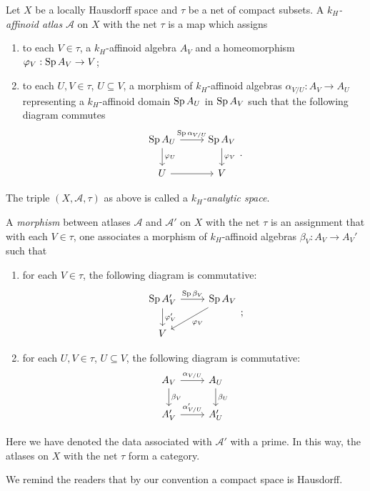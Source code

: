 \begin{definition}
    Let $X$ be a locally Hausdorff space and $\tau$ be a net of compact subsets. A \emph{$k_H$-affinoid atlas} $\mathcal{A}$ on $X$ with the net $\tau$ is a map which assigns 
    \begin{enumerate}
        \item to each $V\in \tau$, a $k_H$-affinoid algebra $A_V$ and a homeomorphism $\varphi_V:\operatorname{Sp} A_V\rightarrow V$;
        \item to each $U,V\in \tau$, $U\subseteq V$, a morphism of $k_H$-affinoid algebras $\alpha_{V/U}:A_V\rightarrow A_U$ representing a $k_H$-affinoid domain $\operatorname{Sp} A_U$ in $\operatorname{Sp} A_V$ such that the following diagram commutes
        \[
            \begin{tikzcd}
                \Sp A_U \arrow[d, "\varphi_U"] \arrow[r, "\Sp \alpha_{V/U}"] & \Sp A_V \arrow[d, "\varphi_V"] \\
                U \arrow[r]                                                  & V                             
            \end{tikzcd}.  
        \]
    \end{enumerate}
    The triple $(X,\mathcal{A},\tau)$ as above is called a \emph{$k_H$-analytic space}.

    A \emph{morphism} between atlases $\mathcal{A}$ and $\mathcal{A}'$ on $X$ with the net $\tau$ is an assignment that with each $V\in \tau$, one associates a morphism of $k_H$-affinoid algebras $\beta_V:A_V\rightarrow A_V'$ such that
    \begin{enumerate}
        \item for each $V\in \tau$, the following diagram is commutative:
        \[
            \begin{tikzcd}
                \Sp A_V' \arrow[d, "\varphi_V'"] \arrow[r, "\Sp \beta_V"] & \Sp A_V \arrow[ld, "\varphi_V"] \\
                V                                                         &                                
                \end{tikzcd};
        \]
        \item for each $U,V\in \tau$, $U\subseteq V$, the following diagram is commutative:
        \[
            \begin{tikzcd}
                A_V \arrow[r, "\alpha_{V/U}"] \arrow[d, "\beta_V"] & A_U \arrow[d, "\beta_U"] \\
                A_V' \arrow[r, "\alpha'_{V/U}"]                    & A_U'                    
            \end{tikzcd}
        \]
    \end{enumerate}
    Here we have denoted the data associated with $\mathcal{A}'$ with a prime. In this way, the atlases on $X$ with the net $\tau$ form a category.
\end{definition}
We remind the readers that by our convention a compact space is Hausdorff. 

